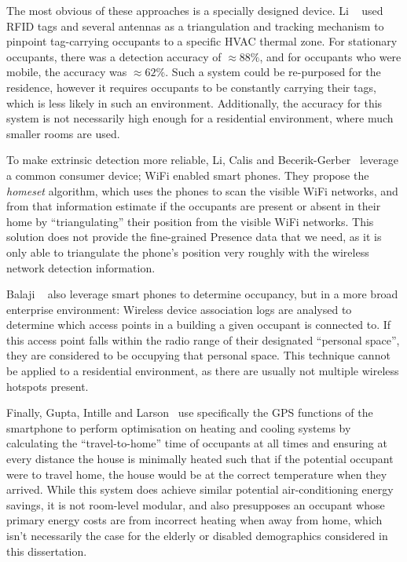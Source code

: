 \documentclass[../thesis/thesis.tex]{subfiles}
\begin{document}
The most obvious of these approaches is a specially designed device. Li \etal~\cite{li2012measuring} used RFID tags and several antennas as a triangulation and tracking mechanism to pinpoint tag-carrying occupants to a specific HVAC thermal zone. For stationary occupants, there was a detection accuracy of $\approx88\%$, and for occupants who were mobile, the accuracy was $\approx62\%$. Such a system could be re-purposed for the residence, however it requires occupants to be constantly carrying their tags, which is less likely in such an environment. Additionally, the accuracy for this system is not necessarily high enough for a residential environment, where much smaller rooms are used.

To make extrinsic detection more reliable, Li, Calis and Becerik-Gerber~\cite{kleiminger2013inferring} leverage a common consumer device; WiFi enabled smart phones. They propose the \textit{homeset} algorithm, which uses the phones to scan the visible WiFi networks, and from that information estimate if the occupants are present or absent in their home by ``triangulating'' their position from the visible WiFi networks. This solution does not provide the fine-grained Presence data that we need, as it is only able to triangulate the phone's position very roughly with the wireless network detection information.

Balaji \etal~\cite{balaji2013sentinel} also leverage smart phones to determine occupancy, but in a more broad enterprise environment: Wireless device association logs are analysed to determine which access points in a building a given occupant is connected to. If this access point falls within the radio range of their designated ``personal space'', they are considered to be occupying that personal space. This technique cannot be applied to a residential environment, as there are usually not multiple wireless hotspots present.

Finally, Gupta, Intille and Larson~\cite{gupta2009adding} use specifically the GPS functions of the smartphone to perform optimisation on heating and cooling systems by calculating the ``travel-to-home'' time of occupants at all times and ensuring at every distance the house is minimally heated such that if the potential occupant were to travel home, the house would be at the correct temperature when they arrived. While this system does achieve similar potential air-conditioning energy savings, it is not room-level modular, and also presupposes an occupant whose primary energy costs are from incorrect heating when away from home, which isn't necessarily the case for the elderly or disabled demographics considered in this dissertation.
\end{document}
